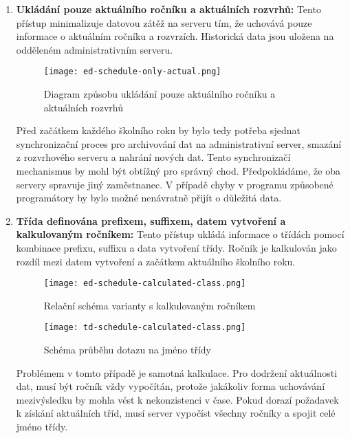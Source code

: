 \begin{enumerate}
    \item \textbf{Ukládání pouze aktuálního ročníku a aktuálních rozvrhů:} Tento přístup minimalizuje datovou zátěž na serveru tím, že uchovává pouze informace o aktuálním ročníku a rozvrzích. Historická data jsou uložena na odděleném administrativním serveru.

    \begin{figure}[H]
        \centering
        \texttt{[image: ed-schedule-only-actual.png]}
        \caption{Diagram způsobu ukládání pouze aktuálního ročníku a aktuálních rozvrhů}
        \label{fig:ed-schedule-only-actual}
    \end{figure}
    
    Před začátkem každého školního roku by bylo tedy potřeba sjednat synchronizační proces pro archivování dat na administrativní server, smazání z rozvrhového serveru a nahrání nových dat. Tento synchronizačí mechanismus by mohl být obtížný pro správný chod. Předpokládáme, že oba servery spravuje jiný zaměstnanec. V případě chyby v programu způsobené programátory by bylo možné nenávratně přijít o důležitá data.

    \item \textbf{Třída definována prefixem, suffixem, datem vytvoření a kalkulovaným ročníkem:} Tento přístup ukládá informace o třídách pomocí kombinace prefixu, suffixu a data vytvoření třídy. Ročník je kalkulován jako rozdíl mezi datem vytvoření a začátkem aktuálního školního roku.

    \begin{figure}[H]
        \centering
        \texttt{[image: ed-schedule-calculated-class.png]}
        \caption{Relační schéma varianty s kalkulovaným ročníkem}
        \label{fig:ed-schedule-only-actual}
    \end{figure}

    \begin{figure}[H]
        \centering
        \texttt{[image: td-schedule-calculated-class.png]}
        \caption{Schéma průběhu dotazu na jméno třídy}
        \label{fig:td-schedule-calculated-class}
    \end{figure}
    
    Problémem v tomto případě je samotná kalkulace. Pro dodržení aktuálnosti dat, musí být ročník vždy vypočítán, protože jakákoliv forma uchovávání mezivýsledku by mohla vést k nekonzistenci v čase. Pokud dorazí požadavek k získání aktuálních tříd, musí server vypočíst všechny ročníky a spojit celé jméno třídy.


\end{enumerate}
